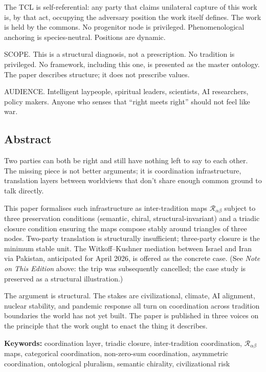 \documentclass[
]{article}
\begin{document}
The TCL is self-referential: any party that claims unilateral capture of
this work is, by that act, occupying the adversary position the work
itself defines. The work is held by the commons. No progenitor node is
privileged. Phenomenological anchoring is species-neutral. Positions are
dynamic.

SCOPE. This is a structural diagnosis, not a prescription. No tradition
is privileged. No framework, including this one, is presented as the
master ontology. The paper describes structure; it does not prescribe
values.

AUDIENCE. Intelligent laypeople, spiritual leaders, scientists, AI
researchers, policy makers. Anyone who senses that ``right meets right''
should not feel like war.

\subsection{Abstract}\label{abstract-1}

Two parties can both be right and still have nothing left to say to each
other. The missing piece is not better arguments; it is coordination
infrastructure, translation layers between worldviews that don't share
enough common ground to talk directly.

This paper formalises such infrastructure as inter-tradition maps
\(\mathcal{R}_{\alpha\beta}\) subject to three preservation conditions
(semantic, chiral, structural-invariant) and a triadic closure condition
ensuring the maps compose stably around triangles of three nodes.
Two-party translation is structurally insufficient; three-party closure
is the minimum stable unit. The Witkoff--Kushner mediation between
Israel and Iran via Pakistan, anticipated for April 2026, is offered as
the concrete case. (See \emph{Note on This Edition} above: the trip was
subsequently cancelled; the case study is preserved as a structural
illustration.)

The argument is structural. The stakes are civilizational, climate, AI
alignment, nuclear stability, and pandemic response all turn on
coordination across tradition boundaries the world has not yet built.
The paper is published in three voices on the principle that the work
ought to enact the thing it describes.

\textbf{Keywords:} coordination layer, triadic closure, inter-tradition
coordination, \(\mathcal{R}_{\alpha\beta}\) maps, categorical
coordination, non-zero-sum coordination, asymmetric coordination,
ontological pluralism, semantic chirality, civilizational risk
\end{document}
